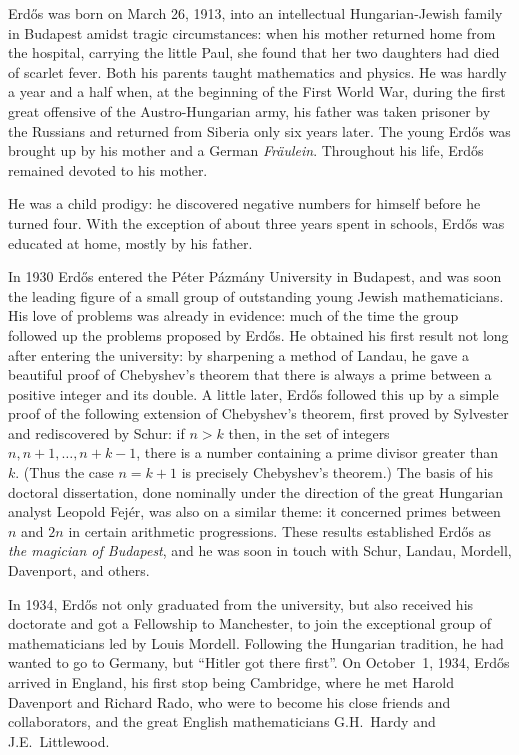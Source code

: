 Erd\H{o}s was born on March 26, 1913, 
into an intellectual Hungarian-Jewish family in Budapest
amidst tragic circumstances:  when his mother returned home from 
the hospital, carrying the little Paul, she found that her two daughters 
had died of scarlet fever.  
Both his parents taught mathematics and physics. 
He was hardly a year and a half when, at the beginning of the First World War,
during the first great 
offensive of the Austro-Hungarian army,
his father was taken prisoner by the Russians and
returned from Siberia only six years later.
The young Erd\H{o}s was brought up by
his mother and a German {\it Fr\"aulein}. Throughout his life, 
Erd\H{o}s remained devoted to his mother.


He was a child prodigy:  
he discovered negative numbers for himself before he turned four. With
the exception of about three years spent in schools, Erd\H{o}s 
was educated at home, mostly by his father. 

In 1930 Erd\H{o}s entered the P\'eter P\'azm\'any University in 
Budapest, and was soon 
the leading figure of a small group of outstanding 
young Jewish mathematicians. His love of problems was already in 
evidence: much of the time the group followed up the problems proposed 
by Erd\H{o}s. He obtained his first  result not long after entering the
university:  by sharpening a method of Landau, he gave a beautiful
proof of Chebyshev's theorem that there is always a prime between a
positive integer and its double.   A little later, Erd\H{o}s followed 
this up by a
simple proof of the following extension of Chebyshev's theorem, 
first proved by Sylvester and rediscovered by Schur:  
if $n>k$ then, in the set of
integers $n,n+1,\ldots,n+k-1$, there is a number containing a prime
divisor greater than~$k$.  (Thus the case $n=k+1$ is precisely Chebyshev's
theorem.)  The basis of his doctoral dissertation, done nominally
under the direction of the great Hungarian analyst Leopold Fej\'er,
was also on a similar theme:  it concerned primes between $n$ and $2n$
in certain arithmetic progressions. 
These results established Erd\H{o}s as {\it the magician of Budapest},
and he was soon in touch with Schur, Landau, Mordell, Davenport, and
others.

In 1934, Erd\H{o}s not only graduated from the university, but also
received his doctorate and got a Fellowship to Manchester, to join the
exceptional group of mathematicians led by Louis Mordell.  Following the 
Hungarian tradition, he had wanted to go to Germany, but ``Hitler got 
there first''. On October~1, 1934, 
Erd\H{o}s arrived in England, his first stop being
Cambridge, where he met Harold Davenport and Richard Rado, who were to
become his close friends and collaborators, and the great English
mathematicians G.H.~Hardy and J.E.~Littlewood.

